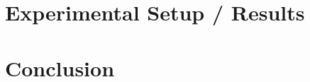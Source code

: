 \documentclass[american, oneside]{ecsgdp}
\begin{document}

\chapter{Experimental Setup / Results} \label{chap:results}

\chapter{Conclusion} \label{chap:conclusion}

\backmatter




\appendix
\end{document}
